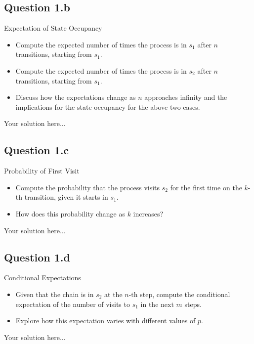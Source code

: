 \documentclass[12pt]{article}
\begin{document}
\subsection*{Question 1.b} Expectation of State Occupancy
    \begin{itemize}
        \item Compute the expected number of times the process is in $s_1$ after $n$ transitions, starting from $s_1$.
        \item Compute the expected number of times the process is in $s_2$ after $n$ transitions, starting from $s_1$.
        \item Discuss how the expectations change as 
$n$ approaches infinity and the implications for the state occupancy for the above two cases.
    \end{itemize}
\begin{solution}
Your solution here...
\end{solution}

\subsection*{Question 1.c} Probability of First Visit
    \begin{itemize}
        \item Compute the probability that the process visits $s_2$ for the first time on the 
$k$-th transition, given it starts in $s_1$.
\item How does this probability change as $k$ increases?
    \end{itemize}
\begin{solution}
Your solution here...
\end{solution}

\subsection*{Question 1.d} Conditional Expectations
    \begin{itemize}
        \item Given that the chain is in $s_2$ at the $n$-th step, compute the conditional expectation of the number of visits to $s_1$ in the next $m$ steps.
\item Explore how this expectation varies with different values of $p$.
    \end{itemize}
\begin{solution}
Your solution here...
\end{solution}
\end{document}
